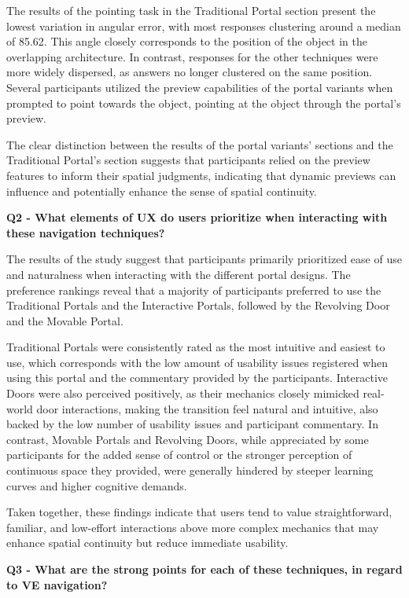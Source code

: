 The results of the pointing task in the Traditional Portal section present the lowest variation in angular error, with most responses 
clustering around a median of 85.62\textdegree. This angle closely corresponds to the position of the object in the overlapping 
architecture. In contrast, responses for the other techniques were more widely dispersed, as answers no longer clustered on the same 
position. Several participants utilized the preview capabilities of the portal variants when prompted to point towards the object, pointing 
at the object through the portal's preview. 

The clear distinction between the results of the portal variants' sections and the Traditional Portal's section suggests that participants 
relied on the preview features to inform their spatial judgments, indicating that dynamic previews can influence and potentially enhance 
the sense of spatial continuity.


\textbf{Q2 - What elements of \gls{UX} do users prioritize when interacting with these navigation techniques?}

The results of the study suggest that participants primarily prioritized ease of use and naturalness when interacting with the different 
portal designs. The preference rankings reveal that a majority of participants preferred to use the Traditional Portals and the 
Interactive Portals, followed by the Revolving Door and the Movable Portal.

Traditional Portals were consistently rated as the most intuitive and easiest to use, which corresponds with the low amount of usability 
issues registered when using this portal and the commentary provided by the participants. Interactive Doors were also perceived 
positively, as their mechanics closely mimicked real-world door interactions, making the transition feel natural and intuitive, also 
backed by the low number of usability issues and participant commentary. 
In contrast, Movable Portals and Revolving Doors, while appreciated by some participants for the added sense of control or the stronger 
perception of continuous space they provided, were generally hindered by steeper learning curves and higher cognitive demands. 

Taken together, these findings indicate that users tend to value straightforward, familiar, and low-effort interactions above more complex 
mechanics that may enhance spatial continuity but reduce immediate usability. 


\textbf{Q3 - What are the strong points for each of these techniques, in regard to \gls{VE} navigation?} 

